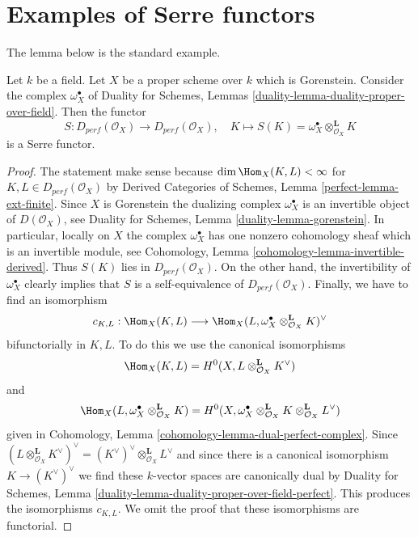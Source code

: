 \section{Examples of Serre functors}
\label{section-examples-Serre-functors}

\noindent
The lemma below is the standard example.

\begin{lemma}
\label{lemma-Serre-functor-Gorenstein-proper}
Let $k$ be a field. Let $X$ be a proper scheme over $k$ which is Gorenstein.
Consider the complex $\omega_X^\bullet$ of
Duality for Schemes, Lemmas \ref{duality-lemma-duality-proper-over-field}.
Then the functor
$$
S : D_{perf}(\mathcal{O}_X) \longrightarrow D_{perf}(\mathcal{O}_X),\quad
K \longmapsto S(K) = \omega_X^\bullet \otimes_{\mathcal{O}_X}^\mathbf{L} K
$$
is a Serre functor.
\end{lemma}

\begin{proof}
The statement make sense because $\dim \Hom_X(K, L) < \infty$
for $K, L \in D_{perf}(\mathcal{O}_X)$ by
Derived Categories of Schemes, Lemma \ref{perfect-lemma-ext-finite}.
Since $X$ is Gorenstein the dualizing complex $\omega_X^\bullet$
is an invertible object of $D(\mathcal{O}_X)$, see
Duality for Schemes, Lemma \ref{duality-lemma-gorenstein}.
In particular, locally on $X$ the complex $\omega_X^\bullet$
has one nonzero cohomology sheaf which is an invertible module, see
Cohomology, Lemma \ref{cohomology-lemma-invertible-derived}.
Thus $S(K)$ lies in $D_{perf}(\mathcal{O}_X)$.
On the other hand, the invertibility of $\omega_X^\bullet$
clearly implies that $S$ is a self-equivalence of $D_{perf}(\mathcal{O}_X)$.
Finally, we have to find an isomorphism
$$
c_{K, L} : \Hom_X(K, L) \longrightarrow
\Hom_X(L, \omega_X^\bullet \otimes_{\mathcal{O}_X}^\mathbf{L} K)^\vee
$$
bifunctorially in $K, L$. To do this we use the canonical isomorphisms
$$
\Hom_X(K, L) = H^0(X, L \otimes_{\mathcal{O}_X}^\mathbf{L} K^\vee)
$$
and
$$
\Hom_X(L, \omega_X^\bullet \otimes_{\mathcal{O}_X}^\mathbf{L} K) =
H^0(X, 
\omega_X^\bullet \otimes_{\mathcal{O}_X}^\mathbf{L} K
\otimes_{\mathcal{O}_X}^\mathbf{L} L^\vee)
$$
given in Cohomology, Lemma \ref{cohomology-lemma-dual-perfect-complex}.
Since $(L \otimes_{\mathcal{O}_X}^\mathbf{L} K^\vee)^\vee =
(K^\vee)^\vee \otimes_{\mathcal{O}_X}^\mathbf{L} L^\vee$
and since there is a canonical isomorphism $K \to (K^\vee)^\vee$
we find these $k$-vector spaces are canonically dual by
Duality for Schemes, Lemma
\ref{duality-lemma-duality-proper-over-field-perfect}.
This produces the isomorphisms $c_{K, L}$.
We omit the proof that these isomorphisms are functorial.
\end{proof}





